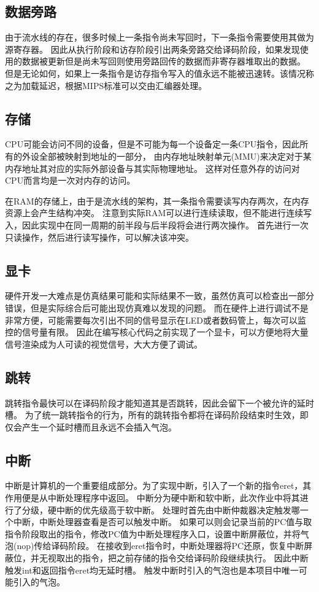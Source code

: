   \subsection{数据旁路}
    由于流水线的存在，很多时候上一条指令尚未写回时，下一条指令需要使用其做为源寄存器。
    因此从执行阶段和访存阶段引出两条旁路交给译码阶段，如果发现使用的数据被更新但是尚未写回则使用旁路回传的数据而非寄存器堆取出的数据。
    但是无论如何，如果上一条指令是访存指令写入的值永远不能被迅速转。该情况称之为加载延迟，根据MIPS标准可以交由汇编器处理。
  \subsection{存储}
    CPU可能会访问不同的设备，但是不可能为每一个设备定一条CPU指令，因此所有的外设全部被映射到地址的一部分，
    由内存地址映射单元(MMU)来决定对于某内存地址其对应的实际外部设备与其实际物理地址。
    这样对任意外存的访问对CPU而言均是一次对内存的访问。

    在RAM的存储上，由于是流水线的架构，其一条指令需要读写内存两次，在内存资源上会产生结构冲突。
    注意到实际RAM可以进行连续读取，但不能进行连续写入，因此实现中在同一周期的前半段与后半段将会进行两次操作。
    首先进行一次只读操作，然后进行读写操作，可以解决该冲突。
  \subsection{显卡}
    硬件开发一大难点是仿真结果可能和实际结果不一致，虽然仿真可以检查出一部分错误，但是实际综合后可能出现仿真难以发现的问题。
    而在硬件上进行调试不是非常方便，可能需要每次引出不同的信号显示在LED或者数码管上，每次可以监控的信号量有限。
    因此在编写核心代码之前实现了一个显卡，可以方便地将大量信号渲染成为人可读的视觉信号，大大方便了调试。
  \subsection{跳转}
    跳转指令最快可以在译码阶段才能知道其是否跳转，因此会留下一个被允许的延时槽。
    为了统一跳转指令的行为，所有的跳转指令都将在译码阶段结束时生效，即仅会产生一个延时槽而且永远不会插入气泡。
  \subsection{中断}
    中断是计算机的一个重要组成部分。为了实现中断，引入了一个新的指令eret，其作用便是从中断处理程序中返回。
    中断分为硬中断和软中断，此次作业中将其进行了分级，硬中断的优先级高于软中断。
    处理时首先由中断仲裁器决定触发哪一个中断，中断处理器查看是否可以触发中断。
    如果可以则会记录当前的PC值与取指令阶段取出的指令，修改PC值为中断处理程序入口，设置中断屏蔽位，并将气泡(nop)传给译码阶段。
    在接收到eret指令时，中断处理器将PC还原，恢复中断屏蔽位，并无视取出的指令，把之前存储的指令交给译码阶段继续执行。
    因此中断触发int和返回指令eret均无延时槽。
    触发中断时引入的气泡也是本项目中唯一可能引入的气泡。

